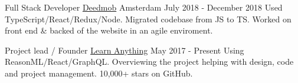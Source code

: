 
\begin{cventries}

  \cventry
    {Full Stack Developer} %
    {\href{https://www.deedmob.com}{Deedmob}} %
    {Amsterdam} %
    {July 2018 - December 2018} %
    {
      {Used TypeScript/React/Redux/Node. Migrated codebase from JS to TS. Worked on front end \& backed of the website in an agile enviroment.}
    }

  \cventry
    {Project lead / Founder} %
    {\href{https://learn-anything.xyz}{Learn Anything}} %
    {} %
    {May 2017 - Present} %
    {
      {Using ReasonML/React/GraphQL. Overviewing the project helping with design, code and project management. 10,000+ stars on GitHub.}
    }

\end{cventries}
